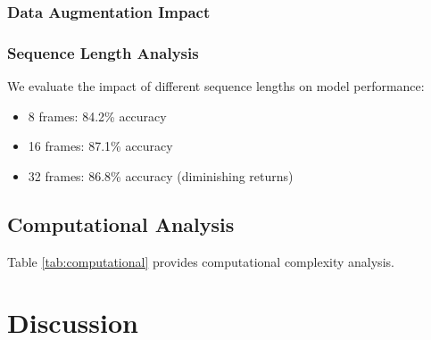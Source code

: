 \documentclass[twocolumn]{article}
\begin{document}
\subsubsection{Data Augmentation Impact}
\begin{table}[H]
\centering
\caption{Impact of Data Augmentation}
\end{table}

\subsubsection{Sequence Length Analysis}
We evaluate the impact of different sequence lengths on model performance:
\begin{itemize}
    \item 8 frames: 84.2\% accuracy
    \item 16 frames: 87.1\% accuracy
    \item 32 frames: 86.8\% accuracy (diminishing returns)
\end{itemize}

\subsection{Computational Analysis}
Table \ref{tab:computational} provides computational complexity analysis.

\begin{table}[H]
\centering
\caption{Computational Complexity Analysis}
\label{tab:computational}
\end{table}

\section{Discussion}
\end{document}
